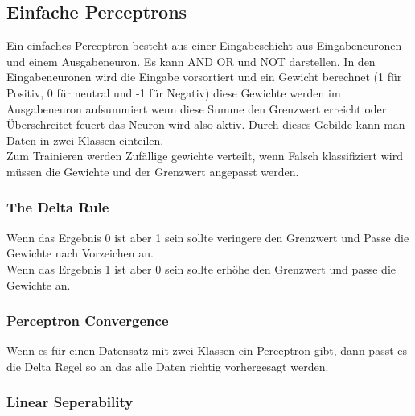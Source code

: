 \documentclass[a4paper]{scrartcl}
\begin{document}
 \subsection{Einfache Perceptrons}
 Ein einfaches Perceptron besteht aus einer Eingabeschicht aus Eingabeneuronen und einem Ausgabeneuron. Es kann AND OR und NOT darstellen. In den Eingabeneuronen wird die Eingabe vorsortiert und ein Gewicht berechnet (1 für Positiv, 0 für neutral und -1 für Negativ) diese Gewichte werden im Ausgabeneuron aufsummiert wenn diese Summe den Grenzwert erreicht oder Überschreitet feuert das Neuron wird also aktiv. Durch dieses Gebilde kann man Daten in zwei Klassen einteilen. \\
 
 Zum Trainieren werden Zufällige gewichte verteilt, wenn Falsch klassifiziert wird müssen die Gewichte und der Grenzwert angepasst werden.
 \pagebreak
 \subsubsection{The Delta Rule}
 Wenn das Ergebnis 0 ist aber 1 sein sollte veringere den Grenzwert und Passe die Gewichte nach Vorzeichen an.\\
 Wenn das Ergebnis 1 ist aber 0 sein sollte erhöhe den Grenzwert und passe die Gewichte an.\\
 \subsubsection{Perceptron Convergence}
 Wenn es für einen Datensatz mit zwei Klassen ein Perceptron gibt, dann passt es die Delta Regel so an das alle Daten richtig vorhergesagt werden.
\subsubsection{Linear Seperability}
  

  
\end{document}
